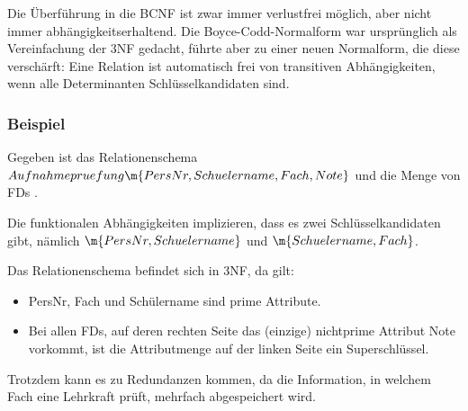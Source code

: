 \documentclass{bschlangaul-theorie}
\begin{document}
Die Überführung in die BCNF ist zwar immer verlustfrei möglich, aber
nicht immer abhängigkeitserhaltend. Die Boyce-Codd-Normalform war
ursprünglich als Vereinfachung der 3NF gedacht, führte aber zu einer
neuen Normalform, die diese verschärft: Eine Relation ist automatisch
frei von transitiven Abhängigkeiten, wenn alle Determinanten
Schlüsselkandidaten sind.





\subsubsection{Beispiel}

Gegeben ist das Relationenschema
$Aufnahmepruefung\m{PersNr, Schuelername, Fach, Note}$
und die Menge von FDs
.

Die funktionalen Abhängigkeiten implizieren, dass es zwei
Schlüsselkandidaten gibt, nämlich
$\m{PersNr, Schuelername}$ und
$\m{Schuelername, Fach}$.

Das Relationenschema befindet sich in 3NF, da gilt:

\begin{itemize}
\item PersNr, Fach und Schülername sind prime Attribute.

\item Bei allen FDs, auf deren rechten Seite das (einzige) nichtprime
Attribut Note vorkommt, ist die Attributmenge auf der linken Seite ein
Superschlüssel.
\end{itemize}

Trotzdem kann es zu Redundanzen kommen, da die Information, in welchem
Fach eine Lehrkraft prüft, mehrfach abgespeichert wird.

\literatur
\end{document}
